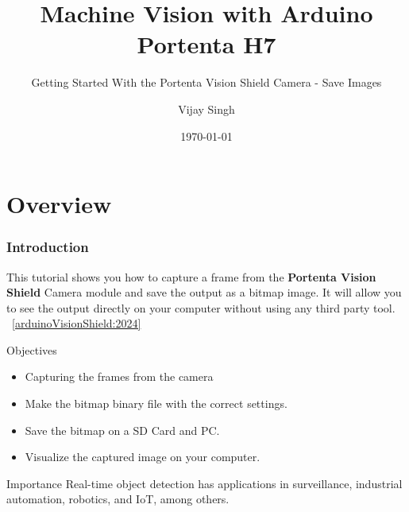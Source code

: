 \documentclass[10pt, a4paper]{beamer}
\title{Machine Vision with Arduino Portenta H7}
\subtitle{Getting Started With the Portenta Vision Shield Camera - Save Images}
\author{Vijay Singh}
\date{\today}
\begin{document}
	
	
	
	\section{Overview}
	\begin{frame}
		\frametitle{Introduction}
		
		\begin{block}{}
			This tutorial shows you how to capture a frame from the \textbf{Portenta Vision Shield} Camera module and save the output as a bitmap image. It will allow you to see the output directly on your computer without using any third party tool. ~\ref{arduinoVisionShield:2024}
		\end{block}
		
		
		\begin{block}{Objectives}
			\begin{itemize}
				\item Capturing the frames from the camera
				\item Make the bitmap binary file with the correct settings.
				\item Save the bitmap on a SD Card and PC.
				\item Visualize the captured image on your computer.
			\end{itemize}
		\end{block}
		
		\begin{block}{Importance}
			Real-time object detection has applications in surveillance, industrial automation, robotics, and IoT, among others.
		\end{block}
		
	\end{frame}
	
\end{document}
